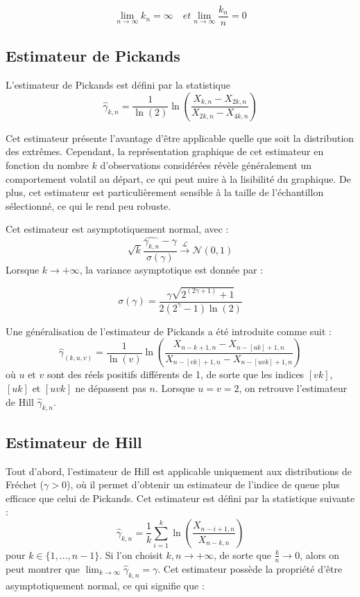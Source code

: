 \documentclass{article}
\begin{document}
\[
\lim_{n \to \infty} k_n = \infty \quad et \lim_{n \to \infty} \frac{k_n}{n} = 0
\]
\subsection{Estimateur de Pickands}

L'estimateur de Pickands est défini par la statistique 
\[
\hat{\gamma}_{k,n} = \frac{1}{\ln(2)} \ln\left(\frac{X_{k,n} - X_{2k,n}}{X_{2k,n} - X_{4k,n}}\right)
\]

Cet estimateur présente l'avantage d'être applicable quelle que soit la distribution des extrêmes. Cependant, la représentation graphique de cet estimateur en fonction du nombre \(k\) d'observations considérées révèle généralement un comportement volatil au départ, ce qui peut nuire à la lisibilité du graphique. De plus, cet estimateur est particulièrement sensible à la taille de l'échantillon sélectionné, ce qui le rend peu robuste.

Cet estimateur est asymptotiquement normal, avec :
\[
\sqrt{k} \frac{\hat{\gamma_{k,n}} - \gamma}{\sigma(\gamma)} \xrightarrow{\mathcal{L}} \mathcal{N}(0,1)
\]
Lorsque \( k \to +\infty \), la variance asymptotique est donnée par :

\[
\sigma(\gamma)= \frac{\gamma \sqrt{2^{(2\gamma+1)}+1}}{2(2^{\gamma}-1) \ln(2)}
\]

Une généralisation de l'estimateur de Pickands a été introduite comme suit :
\[
\hat{\gamma}_{(k,u,v)} = \frac{1}{\ln(v)} \ln\left(\frac{X_{n-k+1,n} - X_{n-[uk]+1,n}}{X_{n-[vk]+1,n} - X_{n-[uvk]+1,n}}\right)
\]
où \(u\) et \(v\) sont des réels positifs différents de 1, de sorte que les indices \([vk]\), \([uk]\) et \([uvk]\) ne dépassent pas \(n\). Lorsque \(u = v = 2\), on retrouve l'estimateur de Hill \(\hat{\gamma}_{k,n}\).

\subsection{Estimateur de Hill}

Tout d'abord, l'estimateur de Hill est applicable uniquement aux distributions de Fréchet (\(\gamma > 0\)), où il permet d'obtenir un estimateur de l'indice de queue plus efficace que celui de Pickands. Cet estimateur est défini par la statistique suivante :
\[
\hat{\gamma}_{k,n} = \frac{1}{k} \sum_{i=1}^{k} \ln(\frac{X_{n-i+1,n}}{X_{n-k,n}})
\]
pour \( k \in \{1, \dots, n-1\} \).
Si l'on choisit \( k, n \to +\infty \), de sorte que \(\frac{k}{n} \to 0\), alors on peut montrer que \(\lim_{k \to \infty} \hat{\gamma}_{k,n} = \gamma\). Cet estimateur possède la propriété d'être asymptotiquement normal, ce qui signifie que :
\end{document}
